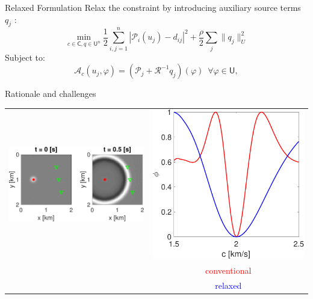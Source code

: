 \documentclass{beamer}
\newcommand{\sU}{\mathsf{U}}
\newcommand{\sC}{\mathsf{C}}
\newcommand{\mA}{\mathcal{A}}
\newcommand{\mP}{\mathcal{P}}
\newcommand{\mR}{\mathcal{R}}
\begin{document}
\begin{frame}{Relaxed Formulation}
Relax the constraint by introducing auxiliary source terms $q_j$ \cite{van2015penalty}:
\begin{equation}
  \label{eq:relaxed}
\min_{c\in\sC, q\in\sU^n} {\textstyle\frac{1}{2}} \sum_{i,j=1}^n |\mP_i(u_j) - d_{ij}|^2 + {\textstyle\frac{\rho}{2}} \sum_j \|q_j\|_U^2
\end{equation}
Subject to:
\begin{equation*}
\mA_c(u_j, \varphi) = (\mP_j + \mR^{-1}q_j)(\varphi) \,\,\, \forall \varphi \in \sU,
\end{equation*}
\end{frame}

\begin{frame}{Rationale and challenges}
\centering
\begin{tabular}{cc}
  \includegraphics[scale=.35]{./figs/exampe2a-eps-converted-to.pdf} &
  \includegraphics[scale=.2]{./figs/example3a-eps-converted-to.pdf} \\
    & \textcolor{red}{conventional} \\
  & \textcolor{blue}{relaxed}
\end{tabular}


\end{frame}
\end{document}
